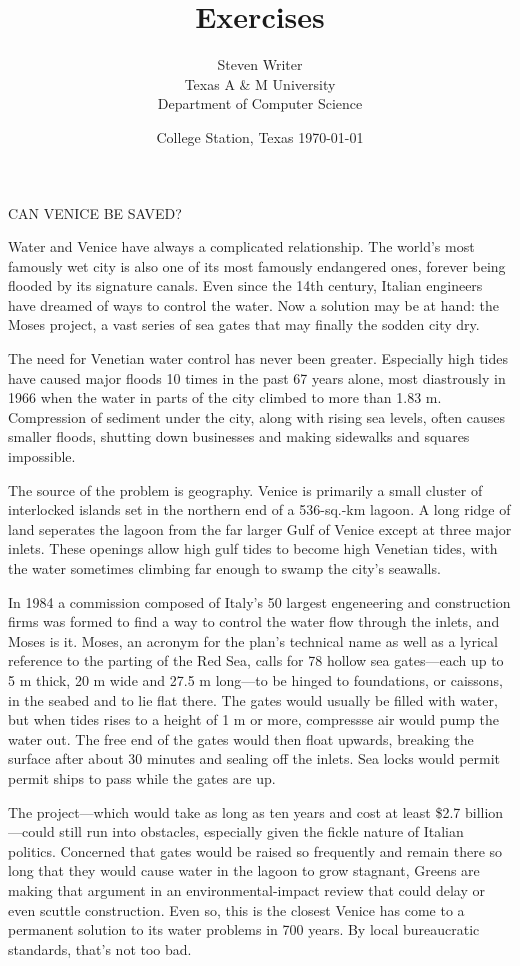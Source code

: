 \documentclass{article}
\begin{document}
\title{Exercises} \author{Steven Writer\\Texas A \& M University\\
Department of Computer Science}
\date{College Station, Texas \today} \maketitle
CAN VENICE BE SAVED?

Water and Venice have always a complicated relationship. 
The world's most famously wet city is also one of its most
famously endangered ones, forever being flooded by its
signature canals. Even since the 14th century, Italian
engineers have dreamed of ways to control the water. Now
a solution may be at hand: the Moses project, a vast series
of sea gates that may finally the sodden city dry.

The need for Venetian water control has never been greater.
Especially high tides have caused major floods 10 times in
the past 67 years alone, most diastrously in 1966 when the
water in parts of the city climbed to more than 1.83 m.
Compression of sediment under the city, along with rising sea
levels, often causes smaller floods, shutting down businesses
and making sidewalks and squares impossible.

The source of the problem is geography. Venice is primarily a
small cluster of interlocked islands set in the northern end of
a 536-sq.-km lagoon. A long ridge of land seperates the lagoon
from the far larger Gulf of Venice except at three major inlets.
These openings allow high gulf tides to become high Venetian tides,
with the water sometimes climbing far enough to swamp the city's
seawalls.

In 1984 a commission composed of Italy's 50 largest engeneering and
construction firms was formed to find a way to control the water
flow through the inlets, and Moses is it. Moses, an acronym for the
plan's technical name as well as a lyrical reference to the parting of
the Red Sea, calls for 78 hollow sea gates---each up to 5 m thick, 20 m
wide and 27.5 m long---to be hinged to foundations, or caissons, in the
seabed and to lie flat there. The gates would usually be filled with
water, but when tides rises to a height of 1 m or more, compressse air
would pump the water out. The free end of the gates would then float
upwards, breaking the surface after about 30 minutes and sealing off 
the inlets. Sea locks would permit permit ships to pass while the gates
are up.

The project---which would take as long as ten years and cost at least
\$2.7 billion---could still run into obstacles, especially given the
fickle nature of Italian politics. Concerned that gates would be raised
so frequently and remain there so long that they would cause water in the
lagoon to grow stagnant, Greens are making that argument in an
environmental-impact review that could delay or even scuttle construction.
Even so, this is the closest Venice has come to a permanent solution to 
its water problems in 700 years. By local bureaucratic standards, that's
not too bad.
\end{document}
